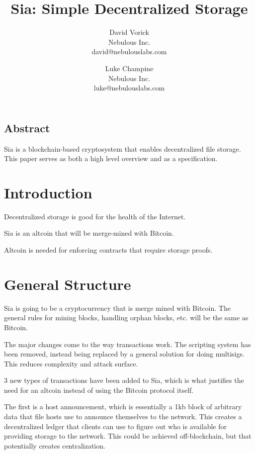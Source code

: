 \documentclass[twocolumn]{article}
\begin{document}
\frenchspacing

\title{Sia: Simple Decentralized Storage}

\author{
{\rm David Vorick}\\
Nebulous Inc.\\
david@nebulouslabs.com
\and
{\rm Luke Champine}\\
Nebulous Inc.\\
luke@nebulouslabs.com
}

\maketitle

\subsection*{Abstract}
Sia is a blockchain-based cryptosystem that enables decentralized file storage.
This paper serves as both a high level overview and as a specification.

\section{Introduction}
Decentralized storage is good for the health of the Internet.

Sia is an altcoin that will be merge-mined with Bitcoin.

Altcoin is needed for enforcing contracts that require storage proofs.

\section{General Structure}

Sia is going to be a cryptocurrency that is merge mined with Bitcoin.
The general rules for mining blocks, handling orphan blocks, etc. will be the same as Bitcoin.

The major changes come to the way transactions work.
The scripting system has been removed, instead being replaced by a general solution for doing multisigs.
This reduces complexity and attack surface.

3 new types of transactions have been added to Sia, which is what justifies the need for an altcoin instead of using the Bitcoin protocol itself.

The first is a host announcement, which is essentially a 1kb block of arbitrary data that file hosts use to announce themselves to the network.
This creates a decentralized ledger that clients can use to figure out who is available for providing storage to the network.
This could be achieved off-blockchain, but that potentially creates centralization.
\end{document}
